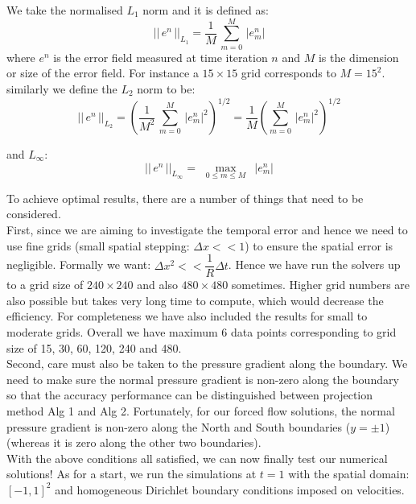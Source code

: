 We take the normalised $L_1$ norm and it is defined as:
\begin{equation}
||\,e^n\,||_{L_1} = \dfrac{1}{M}\,\sum^M_{m=0}\,|e^n_m|
\end{equation} 
where $e^n$ is the error field measured at time iteration $n$ and $M$ is the dimension or size of the error field. For instance a $15 \times 15$ grid corresponds to $M = 15^2$.\\

similarly we define the $L_2$ norm to be:
\begin{equation}
||\,e^n\,||_{L_2} = \left(\dfrac{1}{M^2}\,\sum^M_{m=0}\,|e^n_m|^2\right)^{1/2} = \dfrac{1}{M}\left(\sum^M_{m=0}\,|e^n_m|^2\right)^{1/2}
\end{equation}

and $L_\infty$:
\begin{equation}
||\,e^n\,||_{L_\infty} = \max_{\,\,\,0 \leq m \leq M\,\,\,}\,|e^n_m|
\end{equation}

To achieve optimal results, there are a number of things that need to be considered. \\
First, since we are aiming to investigate the temporal error and hence we need to use fine grids (small spatial stepping: $\Delta x <<1$) to ensure the spatial error is negligible. Formally we want: $\Delta x^2 << \dfrac{1}{R}\Delta t$. Hence we have run the solvers up to a grid size of $240 \times 240$ and also $480 \times 480$ sometimes. Higher grid numbers are also possible but takes very long time to compute, which would decrease the efficiency. For completeness we have also included the results for small to moderate grids. Overall we have maximum 6 data points corresponding to grid size of 15, 30, 60, 120, 240 and 480.\\

Second, care must also be taken to the pressure gradient along the boundary. We need to make sure the normal pressure gradient is non-zero along the boundary so that the accuracy performance can be distinguished between projection method Alg 1 and Alg 2. Fortunately, for our forced flow solutions, the normal pressure gradient is non-zero along the North and South boundaries ($y = \pm 1$) (whereas it is zero along the other two boundaries).\\

With the above conditions all satisfied, we can now finally test our numerical solutions! As for a start, we run the simulations at $t = 1$ with the spatial domain: $[-1,1]^2$ and homogeneous Dirichlet boundary conditions imposed on velocities.\\

